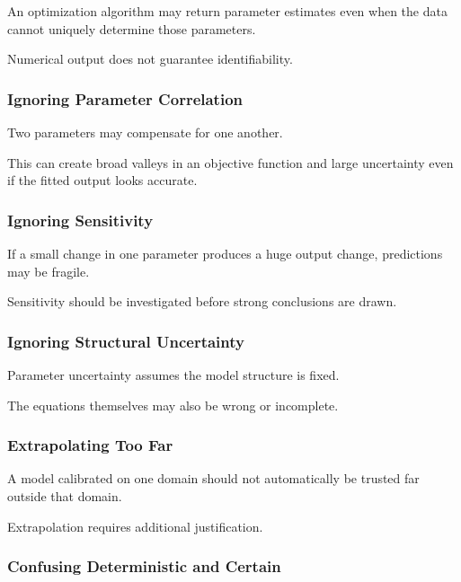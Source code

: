An optimization algorithm may return parameter estimates even when the data
cannot uniquely determine those parameters.

Numerical output does not guarantee identifiability.

\subsubsection{Ignoring Parameter Correlation}

Two parameters may compensate for one another.

This can create broad valleys in an objective function and large uncertainty
even if the fitted output looks accurate.

\subsubsection{Ignoring Sensitivity}

If a small change in one parameter produces a huge output change, predictions
may be fragile.

Sensitivity should be investigated before strong conclusions are drawn.

\subsubsection{Ignoring Structural Uncertainty}

Parameter uncertainty assumes the model structure is fixed.

The equations themselves may also be wrong or incomplete.

\subsubsection{Extrapolating Too Far}

A model calibrated on one domain should not automatically be trusted far
outside that domain.

Extrapolation requires additional justification.

\subsubsection{Confusing Deterministic and Certain}

